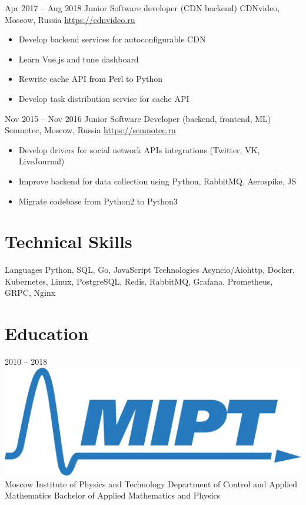 \documentclass[11pt,a4paper]{moderncv}
\begin{document}
  \cventry
    {Apr 2017 – Aug 2018}
    {Junior Software developer (CDN backend)}
    {CDNvideo, Moscow, Russia}
    {\url{https://cdnvideo.ru}}
    {}
    {
      \begin{itemize}\setlength\itemindent{6pt}
        \item Develop backend services for autoconfigurable CDN
        \item Learn Vue.js and tune dashboard
        \item Rewrite cache API from Perl to Python
        \item Develop task distribution service for cache API
      \end{itemize}
    }

  \cventry
    {Nov 2015 – Nov 2016}
    {Junior Software Developer (backend, frontend, ML)}
    {Semnotec, Moscow, Russia}
    {\url{https://semnotec.ru}}
    {}
    {
      \begin{itemize}\setlength\itemindent{6pt}
        \item Develop drivers for social network APIs integrations (Twitter, VK, LiveJournal)
        \item Improve backend for data collection using Python, RabbitMQ, Aerospike, JS
        \item Migrate codebase from Python2 to Python3
      \end{itemize}
    }

\section{Technical Skills}
  \cvline
    {Languages}{
      Python,
      SQL,
      Go,
      JavaScript
    }
  \cvline
    {Technologies}{
      Asyncio/Aiohttp,
      Docker,
      Kubernetes,
      Linux,
      PostgreSQL,
      Redis,
      RabbitMQ,
      Grafana,
      Prometheus,
      GRPC,
      Nginx
    }

\section{Education}
  \vspace*{-5mm}
  \cventry
    {2010 – 2018}
    {\includegraphics[scale=0.5]{mipt-en-blue} Moscow Institute of Physics and Technology}
    {}
    {}{}
    {
      Department of Control and Applied Mathematics \newline{}
      Bachelor of Applied Mathematics and Physics \newline{}
    }
    {}
\end{document}
